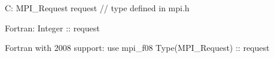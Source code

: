 C:
MPI_Request request // type defined in mpi.h

Fortran:
Integer :: request

Fortran with 2008 support:
use mpi_f08
Type(MPI_Request) :: request
